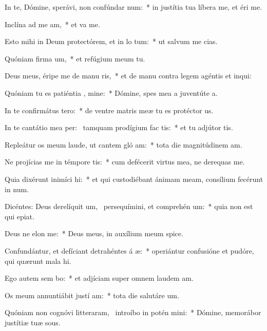 \item In te, Dómine, sperávi, non confúndar  num:~* in justítia tua líbera me, et éri me.
\item Inclína ad me  am,~* et va me.
\item Esto mihi in Deum protectórem, et in lo tum:~* ut salvum me cias.
\item Quóniam firma um,~* et refúgium meum  tu.
\item Deus meus, éripe me de manu ris,~* et de manu contra legem agéntis et inqui:
\item Quóniam tu es patiéntia , mine:~* Dómine, spes mea a juventúte a.
\item In te confirmátus   tero:~* de ventre matris meæ tu es protéctor us.
\item In te cantátio mea per:~\pscross{} tamquam prodígium fac  tis:~* et tu adjútor tis.
\item Repleátur os meum laude, ut cantem gló am:~* tota die magnitúdinem am.
\item Ne projícias me in témpore tis:~* cum defécerit virtus mea, ne derequas me.
\item Quia dixérunt inimíci  hi:~* et qui custodiébant ánimam meam, consílium fecérunt in num.
\item Dicéntes: Deus derelíquit um,~\pscross{} persequímini, et comprehén um:~* quia non est qui epiat.
\item Deus ne elon  me:~* Deus meus, in auxílium meum spice.
\item Confundántur, et defíciant detrahéntes á æ:~* operiántur confusióne et pudóre, qui quærunt mala hi.
\item Ego autem sem bo:~* et adjíciam super omnem laudem am.
\item Os meum annuntiábit justí am:~* tota die salutáre um.
\item Quóniam non cognóvi litteraram,~\pscross{} introíbo in potén mini:~* Dómine, memorábor justítiæ tuæ sous.
